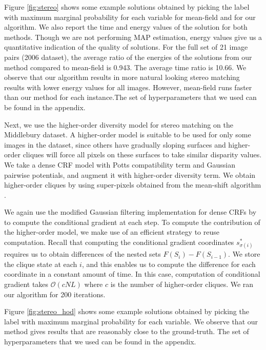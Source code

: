 Figure \ref{fig:stereo} shows some example solutions obtained by picking the
label with maximum marginal probability for each variable for mean-field and
for our algorithm. We also report the time and energy values of the solution
for both methods. Though we are not performing MAP estimation, energy values
give us a quantitative indication of the quality of solutions. For the full set of
21 image pairs (2006 dataset), the average ratio of the energies of the solutions from our method 
compared to mean-field is 0.943. The average time ratio is 10.66. We observe that our algorithm results in more natural looking stereo matching results with lower energy values for all images. However, mean-field runs faster than our method for each instance.The set of hyperparameters that we used can be found in the
appendix.

\label{subsec:stereo_hod}
 Next, we use the higher-order diversity model for stereo
matching on the Middlebury dataset. A higher-order model is suitable to be used
for only some images in the dataset, since others have gradually sloping
surfaces and higher-order cliques will force all pixels on these surfaces to
take similar disparity values.  We take a dense CRF model with Potts
compatibility term and Gaussian pairwise potentials, and augment it with
higher-order diversity term. We obtain higher-order cliques by using super-pixels obtained from the mean-shift algorithm \citep{comaniciu2002mean}.

 We again use the modified Gaussian filtering implementation for dense CRFs by
\citep{ajanthan2017efficient} to compute the conditional gradient at each step.
To compute the contribution of the higher-order model, we make use of an
efficient strategy to reuse computation. Recall that computing the conditional
gradient coordinates $s^*_{\sigma(i)}$ requires us to obtain differences of the
nested sets $F(S_i) - F(S_{i - 1})$. We store the clique state at each $i$, and
this enables us to compute the difference for each coordinate in a constant
amount of time. In this case, computation of conditional gradient takes
$\mathcal{O}(cNL)$ where $c$ is the number of higher-order cliques. We ran our
algorithm for 200 iterations.

 Figure \ref{fig:stereo_hod} shows some example solutions
obtained by picking the label with maximum marginal probability for each
variable. We observe that our method gives results that are reasonably close to
the ground-truth. The set of hyperparameters that we used can be found in the
appendix.


